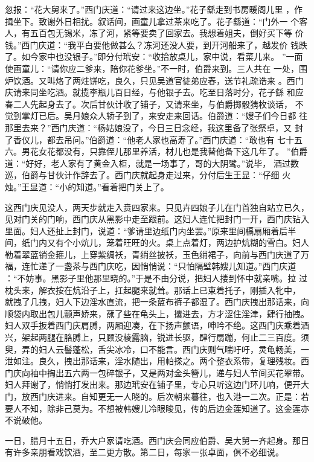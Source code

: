 忽报：“花大舅来了。”西门庆道：“请过来这边坐。”花子繇走到书房暖阁儿里
，作揖坐下。致谢外日相扰。叙话间，画童儿拿过茶来吃了。花子繇道：“门外一
个客人，有五百包无锡米，冻了河，紧等要卖了回家去。我想着姐夫，倒好买下等
价钱。”西门庆道：“我平白要他做甚么？冻河还没人要，到开河船来了，越发价
钱跌了。如今家中也没银子。”即分付玳安：“收拾放桌儿，家中说，看菜儿来。
”一面使画童儿：“请你应二爹来，陪你花爹坐。”不一时，伯爵来到。三人共在
一处，围炉饮酒。又叫烙了两炷饼吃，良久，只见吴道官徒弟应春，送节礼疏诰来
。西门庆请来同坐吃酒。就揽李瓶儿百日经，与他银子去。吃至日落时分，花子繇
和应春二人先起身去了。次后甘伙计收了铺子，又请来坐，与伯爵掷骰猜枚谈话，
不觉到掌灯已后。吴月娘众人轿子到了，来安走来回话。伯爵道：“嫂子们今日都
往那里去来？”西门庆道：“杨姑娘没了，今日三日念经，我这里备了张祭卓，又
封了香仪儿，都去吊问。”伯爵道：“他老人家也高寿了。”西门庆道：“敢也有
七十五六。男花女花都没有，只靠侄儿那里养活，材儿也是我替他备下这几年了。
”伯爵道：“好好，老人家有了黄金入柜，就是一场事了，哥的大阴骘。”说毕，
酒过数巡，伯爵与甘伙计作辞去了。西门庆就起身走过来，分付后生王显：“仔细
火烛。”王显道：“小的知道。”看着把门关上了。

这西门庆见没人，两天步就走入贲四家来。只见卉四娘子儿在门首独自站立已久，
见对门关的门响，西门庆从黑影中走至跟前。这妇人连忙把封门一开，西门庆钻入
里面。妇人还扯上封门，说道：“爹请里边纸门内坐罢。”原来里间槅扇厢着后半
间，纸门内又有个小炕儿，笼着旺旺的火。桌上点着灯，两边护炕糊的雪白。妇人
勒着翠蓝销金箍儿，上穿紫绸袄，青绡丝披袄，玉色绡裙子，向前与西门庆道了万
福，连忙递了一盏茶与西门庆吃，因悄悄说：“只怕隔壁韩嫂儿知道。”西门庆道
：“不妨事。黑影子里他那里晓的。”于是不由分说，把妇人搂到怀中就亲嘴。拉
过枕头来，解衣按在炕沿子上，扛起腿来就耸。那话上已束着托子，刚插入牝中，
就拽了几拽，妇人下边淫水直流，把一条蓝布裤子都湿了。西门庆拽出那话来，向
顺袋内取出包儿颤声娇来，蘸了些在龟头上，攮进去，方才涩住淫津，肆行抽拽。
妇人双手扳着西门庆肩膊，两厢迎凑，在下扬声颤语，呻吟不绝。这西门庆乘着酒
兴，架起两腿在胳膊上，只顾没棱露脑，锐进长驱，肆行扇蹦，何止二三百度。须
臾，弄的妇人云髻蓬松，舌尖冰冷，口不能言。西门庆则气喘吁吁，灵龟畅美，一
泄如注。良久，拽出那话来，淫水随出，用帕搽之。两个整衣系带，复理残妆。西
门庆向袖中掏出五六两一包碎银子，又是两对金头簪儿，递与妇人节间买花翠带。
妇人拜谢了，悄悄打发出来。那边玳安在铺子里，专心只听这边门环儿响，便开大
门，放西门庆进来。自知更无一人晓的。后次朝来暮往，也入港一二次。正是：若
要人不知，除非己莫为。不想被韩嫂儿冷眼睃见，传的后边金莲知道了。这金莲亦
不说破他。

一日，腊月十五日，乔大户家请吃酒。西门庆会同应伯爵、吴大舅一齐起身。那日
有许多亲朋看戏饮酒，至二更方散。第二日，每家一张卓面，俱不必细说。

